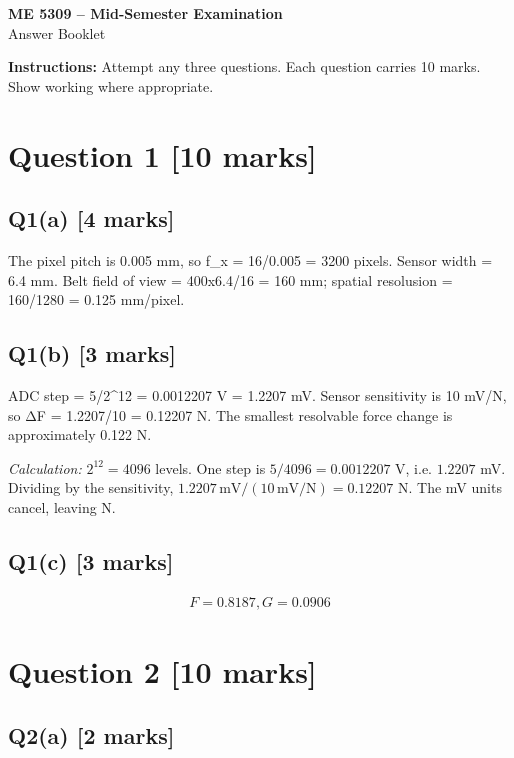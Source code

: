 \documentclass[11pt,a4paper]{article}
\begin{document}
\begin{center}
{\Large\bfseries ME 5309 -- Mid-Semester Examination}\\[3pt]
{\large Answer Booklet}\\[8pt]
\end{center}
\textbf{Instructions:} Attempt any three questions. Each question carries 10 marks. Show working where appropriate.
\section*{Question 1 \hfill [10 marks]}
\subsection*{Q1(a) \hfill [4 marks]}

The pixel pitch is 0.005 mm, so f\_x = 16/0.005 = 3200 pixels.
Sensor width = 6.4 mm.
Belt field of view = 400x6.4/16 = 160 mm; spatial resolusion = 160/1280 = 0.125 mm/pixel.

\subsection*{Q1(b) \hfill [3 marks]}

ADC step = 5/2\textasciicircum{}12 = 0.0012207 V = 1.2207 mV.
Sensor sensitivity is 10 mV/N, so ΔF = 1.2207/10 = 0.12207 N.
The smallest resolvable force change is approximately 0.122 N.\par\smallskip\textit{Calculation:} $2^{12}=4096$ levels. One step is $5/4096=0.0012207$ V, i.e. $1.2207$ mV. Dividing by the sensitivity, $1.2207\,\mathrm{mV}/(10\,\mathrm{mV/N})=0.12207$ N. The mV units cancel, leaving N.

\subsection*{Q1(c) \hfill [3 marks]}

\[\begin{aligned}F = 0.8187, G = 0.0906\end{aligned}\]

\section*{Question 2 \hfill [10 marks]}
\subsection*{Q2(a) \hfill [2 marks]}
\end{document}
